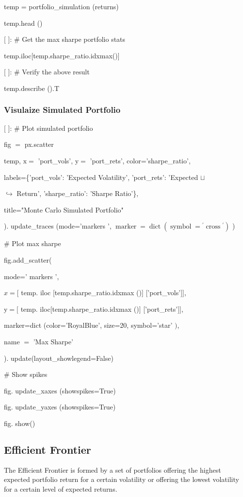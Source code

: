 \documentclass[10pt]{article}
\begin{document}
temp = portfolio\_simulation (returns)

temp.head ()

[ ]: \# Get the max sharpe portfolio stats

temp.iloc[temp.sharpe\_ratio.idxmax()]

[ ]: \# Verify the above result

temp.describe ().T

\subsubsection*{Visulaize Simulated Portfolio}
[ ]: \# Plot simulated portfolio

fig $=$ px.scatter

temp, $\mathrm{x}=$ 'port\_vols', $\mathrm{y}=$ 'port\_rets', color='sharpe\_ratio',

labels=\{'port\_vols': 'Expected Volatility', 'port\_rets': 'Expected $\sqcup$

$\hookrightarrow$ Return', 'sharpe\_ratio': 'Sharpe Ratio'\},

title="Monte Carlo Simulated Portfolio"

). update\_traces (mode='markers ', $\operatorname{marker}=\operatorname{dict}\left(\operatorname{symbol}={ }^{\prime} \operatorname{cross}{ }^{\prime}\right)$ )

\# Plot max sharpe

fig.add\_scatter(

mode=' markers ',

$x=[$ temp. iloc [temp.sharpe\_ratio.idxmax ()] ['port\_vols']],

$\mathrm{y}=[$ temp. iloc[temp.sharpe\_ratio.idxmax ()] ['port\_rets']],

marker=dict (color='RoyalBlue', size=20, symbol='star' $)$,

name $=$ 'Max Sharpe'

). update(layout\_showlegend=False)

\# Show spikes

fig. update\_xaxes (showspikes=True)

fig. update\_yaxes (showspikes=True)

fig. show()

\subsection*{Efficient Frontier}
The Efficient Frontier is formed by a set of portfolios offering the highest expected portfolio return for a certain volatility or offering the lowest volatility for a certain level of expected returns.
\end{document}
